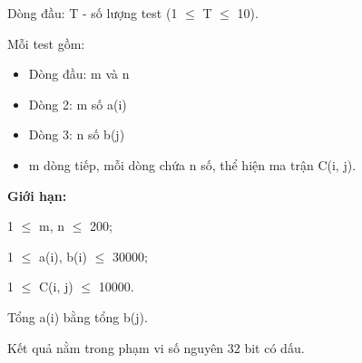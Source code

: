 Dòng đầu: T - số lượng test (1  $\le$  T  $\le$  10).

Mỗi test gồm:
\begin{itemize}
	\item Dòng đầu: m và n
	\item Dòng 2: m số a(i)
	\item Dòng 3: n số b(j)
	\item m dòng tiếp, mỗi dòng chứa n số, thể hiện ma trận C(i, j).
\end{itemize}

\textbf{Giới hạn:}

1  $\le$  m, n  $\le$  200;

1  $\le$  a(i), b(i)  $\le$  30000;

1  $\le$  C(i, j)  $\le$  10000.

Tổng a(i) bằng tổng b(j).

Kết quả nằm trong phạm vi số nguyên 32 bit có dấu.

\